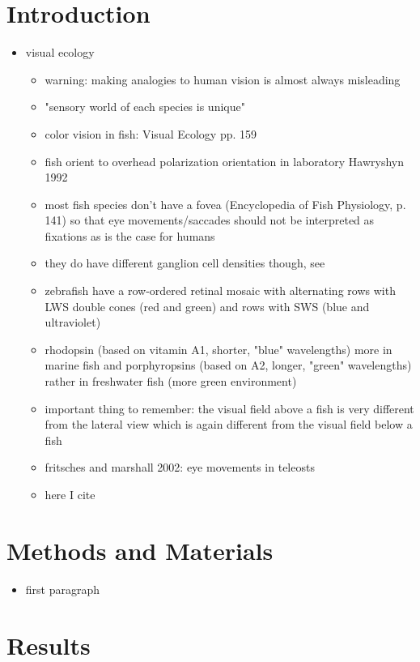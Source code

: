 \documentclass[a4paper,10pt,hidelinks]{scrartcl}
\begin{document}
	\section{Introduction}
	\begin{itemize}
		\item visual ecology
		\begin{itemize}
			\item warning: making analogies to human vision is almost always misleading
			\item "sensory world of each species is unique"
			\item color vision in fish: Visual Ecology pp. 159
			\item fish orient to overhead polarization orientation in laboratory Hawryshyn 1992
			\item most fish species don't have a fovea (Encyclopedia of Fish 
			Physiology, p. 141) so that eye movements/saccades should not be 
			interpreted as fixations as is the case for humans
			\item they do have different ganglion cell densities though, see 
			\cite{Pita2015}
			\item zebrafish have a row-ordered retinal mosaic with alternating rows with LWS double cones (red and green) and rows with SWS (blue and ultraviolet)
			\item rhodopsin (based on vitamin A1, shorter, "blue" wavelengths) more in marine fish and porphyropsins (based on A2, longer, "green" wavelengths) rather in freshwater fish (more green environment)
			\item important thing to remember: the visual field above a fish is very different from the lateral view which is again different from the visual field below a fish
			\item fritsches and marshall 2002: eye movements in teleosts
			\item here I cite \cite{Tytell2008}
		\end{itemize}
	\end{itemize}
	\section{Methods and Materials}
	\begin{itemize}
		\item first paragraph
	\end{itemize}
	\section{Results}
\end{document}
